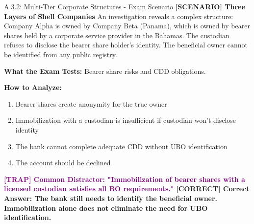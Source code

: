 \documentclass[11pt,a4paper]{beamer}
\newcommand{\trap}[1]{\textcolor{purple}{\textbf{[TRAP] #1}}}
\newcommand{\correct}[1]{\textcolor{green!50!black}{\textbf{[CORRECT] #1}}}
\newcommand{\scenario}[1]{\textcolor{blue!70!black}{\textbf{[SCENARIO] #1}}}
\begin{document}
	\begin{frame}{A.3.2: Multi-Tier Corporate Structures - Exam Scenario}
		\scenario{Three Layers of Shell Companies}
		An investigation reveals a complex structure: Company Alpha is owned by Company Beta (Panama), which is owned by bearer shares held by a corporate service provider in the Bahamas. The custodian refuses to disclose the bearer share holder's identity. The beneficial owner cannot be identified from any public registry.
		
		\vspace{0.1cm}
		\textbf{What the Exam Tests:} Bearer share risks and CDD obligations.
		
		\vspace{0.1cm}
		\textbf{How to Analyze:}
		\begin{enumerate}
			\item Bearer shares create anonymity for the true owner
			\item Immobilization with a custodian is insufficient if custodian won't disclose identity
			\item The bank cannot complete adequate CDD without UBO identification
			\item The account should be declined
		\end{enumerate}
		
		\trap{Common Distractor: "Immobilization of bearer shares with a licensed custodian satisfies all BO requirements."}
		\correct{Correct Answer: The bank still needs to identify the beneficial owner. Immobilization alone does not eliminate the need for UBO identification.}
	\end{frame}
	
	
\end{document}
